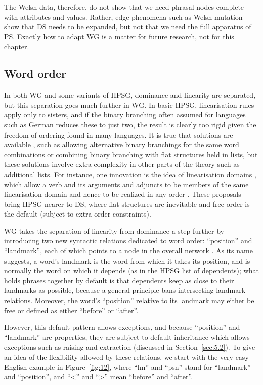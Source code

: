 \documentclass[output=paper
	        ,collection
	        ,collectionchapter
 	        ,biblatex
                ,babelshorthands
                ,newtxmath
                ,draftmode
                ,colorlinks, citecolor=brown
]{./langsci/langscibook}
\begin{document}
The Welsh data, therefore, do not show that we need phrasal nodes complete with attributes and values. Rather, edge phenomena such as Welsh mutation show that DS needs to be expanded, but not that we need the full apparatus of PS. Exactly how to adapt WG is a matter for future research, not for this chapter.


\subsection{Word order}
\label{sec:4.4}

In both WG and some variants of HPSG, dominance and linearity are separated, but this separation goes much further in WG. In basic HPSG, linearisation rules apply only to sisters, and if the binary branching often assumed for languages such as German \citep[Section~10.3]{MuellerGT-Eng2} reduces these to just two, the result is clearly too rigid given the freedom of ordering found in many languages. It is true that solutions are available \citep[Chapter~10]{MuellerGT-Eng2}, such as allowing alternative binary branchings for the same word combinations or combining binary branching with flat structures held in lists, but these solutions involve extra complexity in other parts of the theory such as additional lists. For instance, one innovation is the idea of linearisation domains \citep{Reape94a,Kathol2000a,Babel}, which allow a verb and its arguments and adjuncts to be members of the same linearisation domain and hence to be realized in any order \citep[302]{MuellerGT-Eng2}. These proposals bring HPSG nearer to DS, where flat structures are inevitable and free order is the default (subject to extra order constraints).

WG takes the separation of linearity from dominance a step further by introducing two new syntactic relations dedicated to word order: ``position'' and ``landmark'', each of which points to a node in the overall network \citep{Hudson2018a}. As its name suggests, a word’s landmark is the word from which it takes its position, and is normally the word on which it depends (as in the HPSG list of dependents); what holds phrases together by default is that dependents keep as close to their landmarks as possible, because a general principle bans intersecting landmark relations. Moreover, the word’s ``position'' relative to its landmark may either be free or defined as either ``before'' or ``after''.

However, this default pattern allows exceptions, and because ``position'' and ``landmark'' are properties, they are subject to default inheritance which allows exceptions such as raising and extraction (discussed in Section~\ref{sec:5.2}). To give an idea of the flexibility allowed by these relations, we start with the very easy English example in Figure~\ref{fig:12}, where ``lm'' and ``psn'' stand for ``landmark'' and ``position'', and ``<'' and ``>'' mean ``before'' and ``after''.
\end{document}
